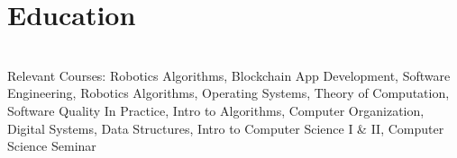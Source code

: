 \documentclass[]{deedy-resume-openfont}
\begin{document}
    
%
%
%
%
\section{Education}
\raggedright

\hfill {}\\
Relevant Courses: Robotics Algorithms, Blockchain App Development, Software Engineering, Robotics Algorithms, Operating Systems, Theory of Computation, Software Quality In Practice, Intro to Algorithms, Computer Organization, Digital Systems, Data Structures, Intro to Computer Science I \& II, Computer Science Seminar 
\sectionsep \\

\hfill {}\\
\sectionsep
%
%
\end{document}
